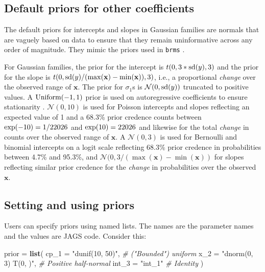 \documentclass[
  american,
]{article}
\newenvironment{Shaded}{\begin{snugshade}}{\end{snugshade}}
\newcommand{\CommentTok}[1]{\textcolor[rgb]{0.56,0.35,0.01}{\textit{#1}}}
\newcommand{\DataTypeTok}[1]{\textcolor[rgb]{0.13,0.29,0.53}{#1}}
\newcommand{\KeywordTok}[1]{\textcolor[rgb]{0.13,0.29,0.53}{\textbf{#1}}}
\newcommand{\NormalTok}[1]{#1}
\newcommand{\StringTok}[1]{\textcolor[rgb]{0.31,0.60,0.02}{#1}}
\begin{document}
\hypertarget{default-priors-for-other-coefficients}{%
\subsection{Default priors for other coefficients}\label{default-priors-for-other-coefficients}}

The default priors for intercepts and slopes in Gaussian families are normals that are vaguely based on data to ensure that they remain uninformative across any order of magnitude. They mimic the priors used in \texttt{brms} \citep{burkner2017}.

For Gaussian families, the prior for the intercept is \(t(0, 3* {\rm sd}(y), 3)\) and the prior for the slope is \(t(0, {\rm sd}(y) / (\max(\mathbf{x}) - \min(\mathbf{x})), 3)\), i.e., a proportional \emph{change} over the observed range of \(\mathbf{x}\). The prior for \(\sigma_1\)s is \(\mathcal{N}(0, {\rm sd}(y))\) truncated to positive values. A \({\rm Uniform}(-1, 1)\) prior is used on autoregressive coefficients to ensure stationarity \citep{fuller1981}. \(\mathcal{N}(0, 10)\) is used for Poisson intercepts and slopes reflecting an expected value of 1 and a 68.3\% prior credence counts between \({\rm exp}(-10) = 1 / 22026\) and \({\rm exp}(10) = 22026\) and likewise for the total \emph{change} in counts over the observed range of \(\mathbf{x}\). A \(\mathcal{N}(0, 3)\) is used for Bernoulli and binomial intercepts on a logit scale reflecting 68.3\% prior credence in probabilities between 4.7\% and 95.3\%, and \(\mathcal{N}(0, 3 / (\max(\mathbf{x}) - \min(\mathbf{x}))\) for slopes reflecting similar prior credence for the \emph{change} in probabilities over the observed \(\mathbf{x}\).

\hypertarget{priors_api}{%
\subsection{Setting and using priors}\label{priors_api}}

Users can specify priors using named lists. The names are the parameter names and the values are JAGS code. Consider this:

\begin{Shaded}
\begin{Highlighting}[]
\NormalTok{prior =}\StringTok{ }\KeywordTok{list}\NormalTok{(}
  \DataTypeTok{cp_1 =} \StringTok{"dunif(10, 50)"}\NormalTok{,      }\CommentTok{# ("Bounded") uniform}
  \DataTypeTok{x_2 =} \StringTok{"dnorm(0, 3) T(0, )"}\NormalTok{,  }\CommentTok{# Positive half-normal}
  \DataTypeTok{int_3 =} \StringTok{"int_1"}              \CommentTok{# Identity}
\NormalTok{)}
\end{Highlighting}
\end{Shaded}
\end{document}
